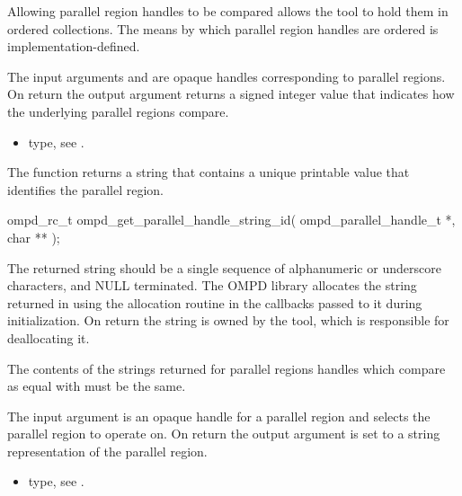 Allowing parallel region handles to be compared allows the tool to hold them in ordered 
collections. The means by which parallel region handles are ordered is implementation-defined.

\argdesc

The input arguments  and  are opaque handles 
corresponding to parallel regions.
On return the output argument   returns a signed 
integer value that indicates how the underlying parallel regions compare.

\crossreferences
\begin{itemize}
	\item {} type, see .
\end{itemize}

\label{ompd:ompd_get_parallel_handle_string_id}
\summary
The  function returns a string that contains a unique 
printable value that identifies the parallel region.

\format

\cspecificstart
\begin{ompSyntax}
ompd_rc_t ompd_get_parallel_handle_string_id(
  ompd_parallel_handle_t *,
  char **
);
\end{ompSyntax}
\cspecificend


\descr
The returned string should be a single sequence of alphanumeric or underscore characters, and 
NULL terminated. The OMPD library allocates the string returned in 
using the allocation routine in the callbacks passed to it during initialization. On return the string is 
owned by the tool, which is responsible for deallocating it.

The contents of the strings returned for parallel regions handles which compare as equal with
 must be the same.

\argdesc
The input argument  is an opaque handle for a parallel region and selects the parallel region to operate on.
On return the output argument  is set to a string representation of the parallel region.

\crossreferences
\begin{itemize}
	\item {} type, see .
\end{itemize}

